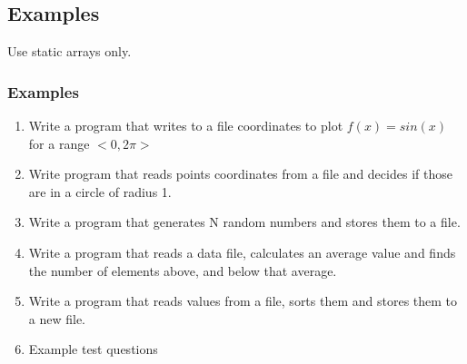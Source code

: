 \documentclass[10pt]{beamer}
\begin{document}
\subsection{Examples}

\begin{frame}
  Use static arrays only.
  \frametitle{Examples}
  \begin{enumerate}
  \item Write a program that writes to a file coordinates to plot $f(x)=sin(x)$
for a range $<0,2\pi>$
  \item Write program that reads points coordinates from a file and decides if those are in a circle of radius 1.
  \item Write a program that generates N random numbers and stores them to a file.
  \item Write a program that reads a data file, calculates an average value and finds the number of elements above, and below that average.
  \item Write a program that reads values from a file, sorts them and stores them to a new file.
  \item Example test questions
\end{enumerate}
  
\end{frame}
\end{document}
